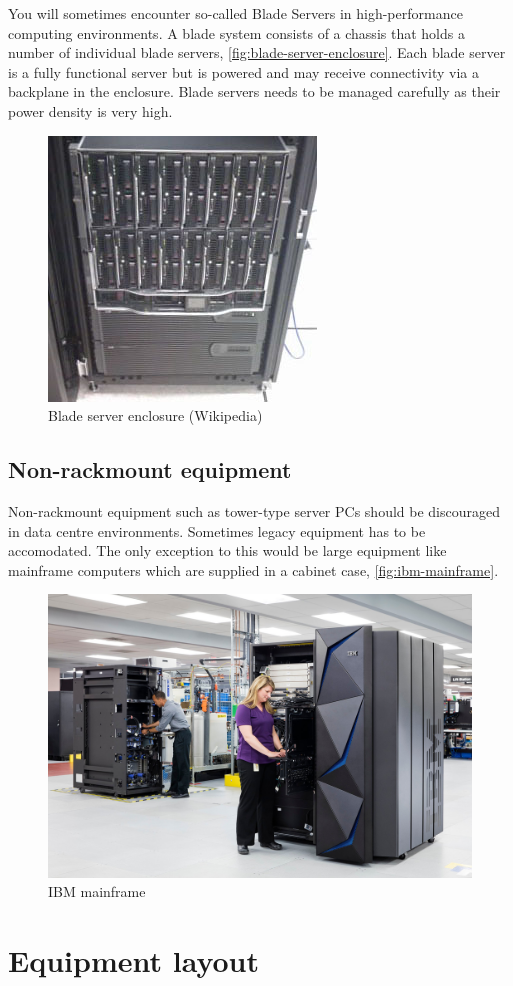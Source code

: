 You will sometimes encounter so-called Blade Servers in high-performance computing environments.
A blade system consists of a chassis that holds a number of individual blade servers, \autoref{fig:blade-server-enclosure}.
Each blade server is a fully functional server but is powered and may receive connectivity via a backplane in the enclosure.
Blade servers needs to be managed carefully as their power density is very high.
\begin{figure}[htbp]
  \centering
  \includegraphics[width=0.3\linewidth]{blade_server_enclosure}
  \caption{Blade server enclosure (Wikipedia)}
  \label{fig:blade-server-enclosure}
\end{figure}

\subsection{Non-rackmount equipment}

Non-rackmount equipment such as tower-type server PCs should be discouraged in data centre environments.
Sometimes legacy equipment has to be accomodated.
The only exception to this would be large equipment like mainframe computers which are supplied in a cabinet case, \autoref{fig:ibm-mainframe}.

\begin{figure}[htbp]
  \centering
  \includegraphics[width=0.5\linewidth]{ibm_mainframe}
  \caption{IBM mainframe}
  \label{fig:ibm-mainframe}
\end{figure}


\section{Equipment layout}

